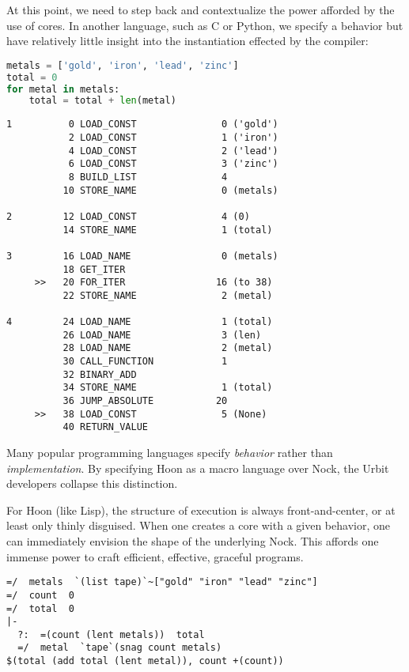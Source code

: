 At this point, we need to step back and contextualize the power afforded by the use of cores.  In another language, such as C or Python, we specify a behavior but have relatively little insight into the instantiation effected by the compiler:

\begin{lstlisting}[language=python,
                   caption={Python loop to sum the length of several strings.}]
metals = ['gold', 'iron', 'lead', 'zinc']
total = 0
for metal in metals:
    total = total + len(metal)
\end{lstlisting}

\begin{lstlisting}[language=jvmis,
                   caption={Python bytecode equivalent}]
1          0 LOAD_CONST               0 ('gold')
           2 LOAD_CONST               1 ('iron')
           4 LOAD_CONST               2 ('lead')
           6 LOAD_CONST               3 ('zinc')
           8 BUILD_LIST               4
          10 STORE_NAME               0 (metals)

2         12 LOAD_CONST               4 (0)
          14 STORE_NAME               1 (total)

3         16 LOAD_NAME                0 (metals)
          18 GET_ITER
     >>   20 FOR_ITER                16 (to 38)
          22 STORE_NAME               2 (metal)

4         24 LOAD_NAME                1 (total)
          26 LOAD_NAME                3 (len)
          28 LOAD_NAME                2 (metal)
          30 CALL_FUNCTION            1
          32 BINARY_ADD
          34 STORE_NAME               1 (total)
          36 JUMP_ABSOLUTE           20
     >>   38 LOAD_CONST               5 (None)
          40 RETURN_VALUE
\end{lstlisting}

Many popular programming languages specify \emph{behavior} rather than \emph{implementation}.  By specifying Hoon as a macro language over Nock, the Urbit developers collapse this distinction.

For Hoon (like Lisp), the structure of execution is always front-and-center, or at least only thinly disguised.  When one creates a core with a given behavior, one can immediately envision the shape of the underlying Nock.  This affords one immense power to craft efficient, effective, graceful programs.

\begin{lstlisting}[language=hoon,
                   caption={Hoon trap to sum the length of several tapes.}]
=/  metals  `(list tape)`~["gold" "iron" "lead" "zinc"]
=/  count  0
=/  total  0
|-
  ?:  =(count (lent metals))  total
  =/  metal  `tape`(snag count metals)
$(total (add total (lent metal)), count +(count))
\end{lstlisting}


